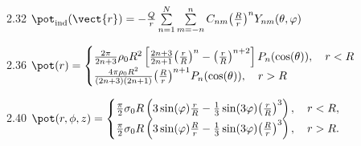 \begin{Solution}{2.{32}}
	$\pot_\text{ind}(\vect{r}) =  - \frac{Q}{r}\sum\limits_{n = 1}^N \sum\limits_{m =  - n}^n {C_{nm}{\left( \frac{R}{r} \right)^n}} Y_{nm}(\theta ,\varphi )$
\end{Solution}
\begin{Solution}{2.{36}}
	$\pot (r) =
		\begin{cases}
			\frac{{2\pi }}{{2n + 3}}{\rho _0}{R^2}\left[ {\frac{{2n + 3}}{{2n + 1}}{{\left( {\frac{r}{R}} \right)}^n} - {{\left( {\frac{r}{R}} \right)}^{n + 2}}} \right]{P_n}(\cos (\theta )) , \quad r<R \\
			\frac{{4\pi {\rho _0}{R^2}}}{{(2n + 3)(2n + 1)}}{\left( {\frac{R}{r}} \right)^{n + 1}}{P_n}(\cos (\theta )) , \quad r>R
		\end{cases}$
\end{Solution}
\begin{Solution}{2.{40}}
	$
		\pot(r, \phi, z) =
		\begin{cases}
			\frac{\pi }{2}{\sigma _0}R\left( {3\sin (\varphi )\frac{r}{R} - \frac{1}{3}\sin (3\varphi ){{\left( {\frac{r}{R}} \right)}^3}} \right), \quad r < R , \\
			\frac{\pi }{2}{\sigma _0}R\left( {3\sin (\varphi )\frac{R}{r} - \frac{1}{3}\sin (3\varphi ){{\left( {\frac{R}{r}} \right)}^3}} \right) , \quad r > R .
		\end{cases}
	$
\end{Solution}
